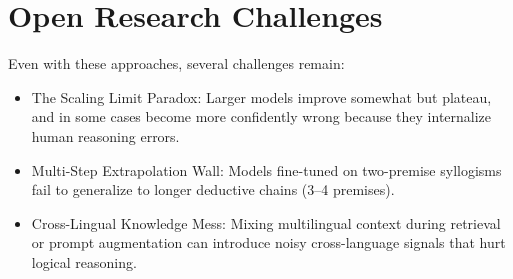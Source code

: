 \documentclass[11pt]{article}
\begin{document}
\section{Open Research Challenges}

Even with these approaches, several challenges remain:

\begin{itemize}
	\item The Scaling Limit Paradox: Larger models improve somewhat but plateau, and in some cases become more confidently wrong because they internalize human reasoning errors.
	\item Multi-Step Extrapolation Wall: Models fine-tuned on two-premise syllogisms fail to generalize to longer deductive chains (3--4 premises).
	\item Cross-Lingual Knowledge Mess: Mixing multilingual context during retrieval or prompt augmentation can introduce noisy cross-language signals that hurt logical reasoning.
\end{itemize}



\end{document}
